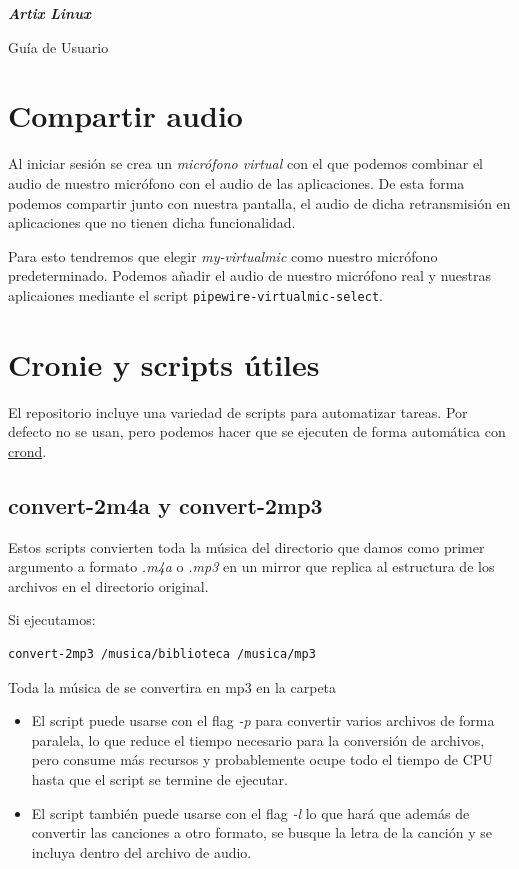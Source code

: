 \documentclass[11pt]{article}
\begin{document}
\pagestyle{empty}
\vspace*{.3\textheight}
{\hfill\Huge\itshape\textcolor{mycolor}{\textbf{Artix Linux}}\par}

{\hfill\Large Guía de Usuario\par}

\clearpage

\section{Compartir audio}

Al iniciar sesión se crea un \emph{micrófono virtual} con el que podemos combinar el audio de nuestro micrófono con el audio de las aplicaciones. De esta forma podemos compartir junto con nuestra pantalla, el audio de dicha retransmisión en aplicaciones que no tienen dicha funcionalidad.

\medskip
\noindent Para esto tendremos que elegir \textit{my-virtualmic} como nuestro micrófono predeterminado. Podemos añadir el audio de nuestro micrófono real y nuestras aplicaiones mediante el script \texttt{pipewire-virtualmic-select}.

\section{Cronie y scripts útiles}

El repositorio incluye una variedad de scripts para automatizar tareas. Por defecto no se usan, pero podemos hacer que se ejecuten de forma automática con \href{https://wiki.archlinux.org/title/cron}{crond}.

\subsection{convert-2m4a y convert-2mp3}

Estos scripts convierten toda la música del directorio que damos como primer argumento a formato \textit{.m4a} o \textit{.mp3} en un mirror que replica al estructura de los archivos en el directorio original.

\medskip
\noindent Si ejecutamos:
\begin{verbatim}
convert-2mp3 /musica/biblioteca /musica/mp3
\end{verbatim}
Toda la música de  se convertira en mp3 en la carpeta 
\begin{itemize}
\item El script puede usarse con el flag \textit{-p} para convertir varios archivos de forma paralela, lo que reduce el tiempo necesario para la conversión de archivos, pero consume más recursos y probablemente ocupe todo el tiempo de CPU hasta que el script se termine de ejecutar.
\item El script también puede usarse con el flag \textit{-l} lo que hará que además de convertir las canciones a otro formato, se busque la letra de la canción y se incluya dentro del archivo de audio.
\end{itemize}
\end{document}
